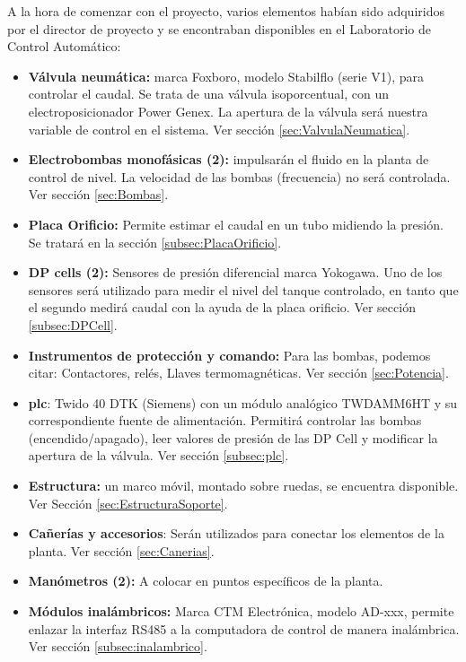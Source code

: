 A la hora de comenzar con el proyecto, varios elementos habían
sido adquiridos por el director de proyecto y se encontraban
disponibles en el Laboratorio de Control Automático:
\begin{itemize}
 \item \textbf{Válvula neumática:} marca Foxboro, modelo Stabilflo (serie V1), para controlar el 
 caudal. Se trata de una válvula isoporcentual, con un electroposicionador Power Genex.
 La apertura de la válvula será nuestra variable de control en el sistema. 
 Ver sección \ref{sec:ValvulaNeumatica}.
  \item \textbf{Electrobombas monofásicas (2):} impulsarán el fluido
  en la planta de control de nivel.
  La velocidad de las bombas (frecuencia) no será controlada.
  Ver sección \ref{sec:Bombas}.
  \item \textbf{Placa Orificio:} Permite estimar el 
  caudal en un tubo midiendo la presión.
  Se tratará en la sección \ref{subsec:PlacaOrificio}.
  \item \textbf{DP cells (2):} Sensores de presión 
  diferencial marca Yokogawa. 
  Uno de los sensores será utilizado para medir el nivel del tanque controlado,
  en tanto que el segundo medirá caudal con la ayuda de la placa orificio.
  Ver sección \ref{subsec:DPCell}.
  \item \textbf{Instrumentos de protección y comando:}
  Para las bombas, podemos citar: Contactores, relés, 
  Llaves termomagnéticas.
  Ver sección \ref{sec:Potencia}.
  \item{\textbf{\gls{plc}}}: Twido 40 DTK (Siemens) con un módulo
  analógico TWDAMM6HT y su correspondiente fuente de alimentación.
  Permitirá controlar las bombas (encendido/apagado), 
  leer valores de presión de las DP Cell y modificar la apertura de la 
  válvula. Ver sección \ref{subsec:plc}.
  \item \textbf{Estructura:} un marco móvil, montado sobre ruedas,
  se encuentra disponible. Ver Sección \ref{sec:EstructuraSoporte}.
  \item \textbf{Cañerías y accesorios}: Serán utilizados para 
  conectar los elementos de la planta. Ver sección \ref{sec:Canerias}.
  \item \textbf{Manómetros (2):} A colocar en 
  puntos específicos de la planta.
  \item \textbf{Módulos inalámbricos:} Marca CTM Electrónica,
  modelo AD-xxx, permite enlazar la 
  interfaz RS485 a la computadora de control
  de manera inalámbrica. Ver sección \ref{subsec:inalambrico}.
\end{itemize}


